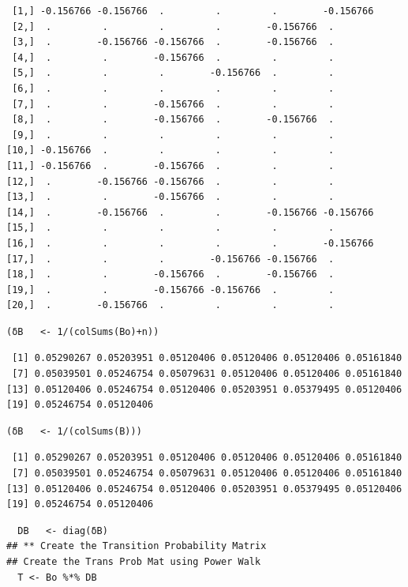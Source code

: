 \documentclass[11pt]{article}
\begin{document}
\begin{enumerate}
\begin{verbatim}
 [1,] -0.156766 -0.156766  .         .         .        -0.156766
 [2,]  .         .         .         .        -0.156766  .
 [3,]  .        -0.156766 -0.156766  .        -0.156766  .
 [4,]  .         .        -0.156766  .         .         .
 [5,]  .         .         .        -0.156766  .         .
 [6,]  .         .         .         .         .         .
 [7,]  .         .        -0.156766  .         .         .
 [8,]  .         .        -0.156766  .        -0.156766  .
 [9,]  .         .         .         .         .         .
[10,] -0.156766  .         .         .         .         .
[11,] -0.156766  .        -0.156766  .         .         .
[12,]  .        -0.156766 -0.156766  .         .         .
[13,]  .         .        -0.156766  .         .         .
[14,]  .        -0.156766  .         .        -0.156766 -0.156766
[15,]  .         .         .         .         .         .
[16,]  .         .         .         .         .        -0.156766
[17,]  .         .         .        -0.156766 -0.156766  .
[18,]  .         .        -0.156766  .        -0.156766  .
[19,]  .         .        -0.156766 -0.156766  .         .
[20,]  .        -0.156766  .         .         .         .
\end{verbatim}

\lstset{language=r,label= ,caption= ,captionpos=b,numbers=none}
\begin{lstlisting}
(δB   <- 1/(colSums(Bo)+n))
\end{lstlisting}

\begin{verbatim}
 [1] 0.05290267 0.05203951 0.05120406 0.05120406 0.05120406 0.05161840
 [7] 0.05039501 0.05246754 0.05079631 0.05120406 0.05120406 0.05161840
[13] 0.05120406 0.05246754 0.05120406 0.05203951 0.05379495 0.05120406
[19] 0.05246754 0.05120406
\end{verbatim}


\lstset{language=r,label= ,caption= ,captionpos=b,numbers=none}
\begin{lstlisting}
(δB   <- 1/(colSums(B)))
\end{lstlisting}

\begin{verbatim}
 [1] 0.05290267 0.05203951 0.05120406 0.05120406 0.05120406 0.05161840
 [7] 0.05039501 0.05246754 0.05079631 0.05120406 0.05120406 0.05161840
[13] 0.05120406 0.05246754 0.05120406 0.05203951 0.05379495 0.05120406
[19] 0.05246754 0.05120406
\end{verbatim}


\lstset{language=r,label= ,caption= ,captionpos=b,numbers=none}
\begin{lstlisting}
  DB   <- diag(δB)
## ** Create the Transition Probability Matrix
## Create the Trans Prob Mat using Power Walk
  T <- Bo %*% DB


\end{lstlisting}
\end{enumerate}
\end{document}
